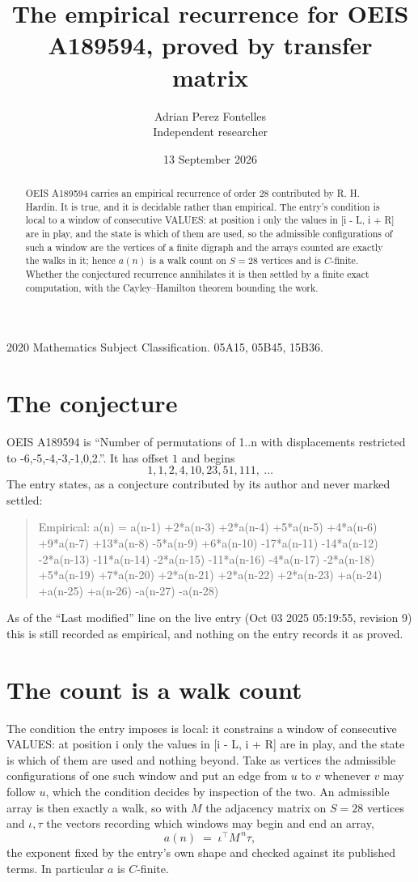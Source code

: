 \documentclass[11pt,a4paper]{article}
\title{The empirical recurrence for OEIS A189594, proved by transfer matrix}
\author{Adrian Perez Fontelles\\ \small Independent researcher}
\date{13 September 2026}
\theoremstyle{plain}
\theoremstyle{definition}
\begin{document}
\maketitle

\begin{abstract}
OEIS A189594 carries an empirical recurrence of order $28$ contributed by R. H. Hardin. It is
true, and it is decidable rather than empirical. The entry's condition is local to a window of consecutive VALUES: at position i only the values in [i - L, i + R] are in play, and the state is which of them are used, so
the admissible configurations of such a window are the vertices of a finite digraph and the
arrays counted are exactly the walks in it; hence $a(n)$ is a walk count on $S=28$ vertices
and is $C$-finite. Whether the conjectured recurrence annihilates it is then settled by a
finite exact computation, with the Cayley--Hamilton theorem bounding the work.
\end{abstract}

\noindent\small 2020 Mathematics Subject Classification. 05A15, 05B45, 15B36.\normalsize

\section{The conjecture}

OEIS A189594 is ``Number of permutations of 1..n with displacements restricted to {-6,-5,-4,-3,-1,0,2}.''. It has offset $1$ and begins
\[
1, 1, 2, 4, 10, 23, 51, 111,\ \dots
\]
The entry states, as a conjecture contributed by its author and never marked settled:
\begin{quote}
Empirical: a(n) = a(n-1) +2*a(n-3) +2*a(n-4) +5*a(n-5) +4*a(n-6) +9*a(n-7) +13*a(n-8) -5*a(n-9) +6*a(n-10) -17*a(n-11) -14*a(n-12) -2*a(n-13) -11*a(n-14) -2*a(n-15) -11*a(n-16) -4*a(n-17) -2*a(n-18) +5*a(n-19) +7*a(n-20) +2*a(n-21) +2*a(n-22) +2*a(n-23) +a(n-24) +a(n-25) +a(n-26) -a(n-27) -a(n-28)
\end{quote}
As of the ``Last modified'' line on the live entry (Oct 03 2025 05:19:55, revision 9) this is still
recorded as empirical, and nothing on the entry records it as proved.

\section{The count is a walk count}

The condition the entry imposes is local: it constrains a window of consecutive VALUES: at position i only the values in [i - L, i + R] are in play, and the state is which of them are used and nothing beyond. Take as
vertices the admissible configurations of one such window and put an edge from $u$ to $v$
whenever $v$ may follow $u$, which the condition decides by inspection of the two. An
admissible array is then exactly a walk, so with $M$ the adjacency matrix on $S=28$ vertices
and $\iota,\tau$ the vectors recording which windows may begin and end an array,
\[
a(n)\;=\;\iota^{\!\top}M^{\,n}\tau ,
\]
the exponent fixed by the entry's own shape and checked against its published terms. In
particular $a$ is $C$-finite.
\end{document}

